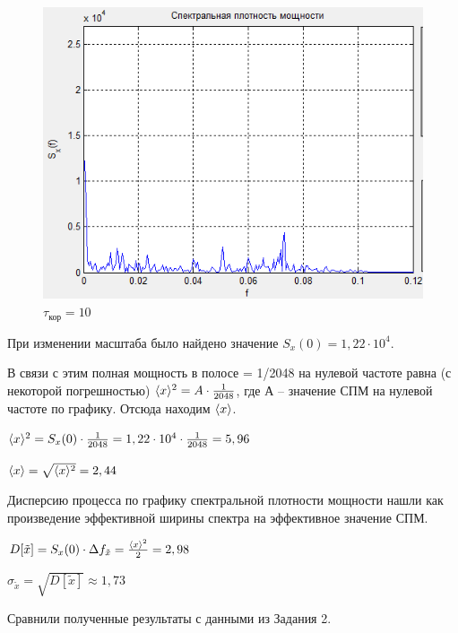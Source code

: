 \begin{figure}[H]
	\centering
    \includegraphics[width=0.8\linewidth]{fig/fig51}
	\caption*{$\tau_\text{кор} = 10$}
\end{figure}	


При изменении масштаба было найдено значение $S_x(0)=1,22\cdot 10^4$.

В связи с этим полная мощность в полосе  = 1/2048 на нулевой частоте равна (с некоторой погрешностью) $\langle x\rangle^2 = A\cdot \frac{1}{2048}$, где $А$ – значение СПМ на нулевой частоте по графику. Отсюда находим $\langle x\rangle$.

$\langle x\rangle^2 = S_x(0)\cdot \frac{1}{2048}= 1,22\cdot 10^4\cdot \frac{1}{2048} = 5,96$

$\langle x\rangle =  \sqrt{\langle x\rangle^2} = 2,44$

Дисперсию процесса по графику спектральной плотности мощности нашли как произведение эффективной ширины спектра на эффективное значение СПМ.

$D[\tilde{x}] = S_x(0)\cdot \Delta f_{\tilde{x}} =\frac{\langle x\rangle^2}{2} = 2,98$

$\sigma_{\tilde{x}} = \sqrt{D[\tilde{x}]}\approx 1,73$

Сравнили полученные результаты с данными из Задания 2.
